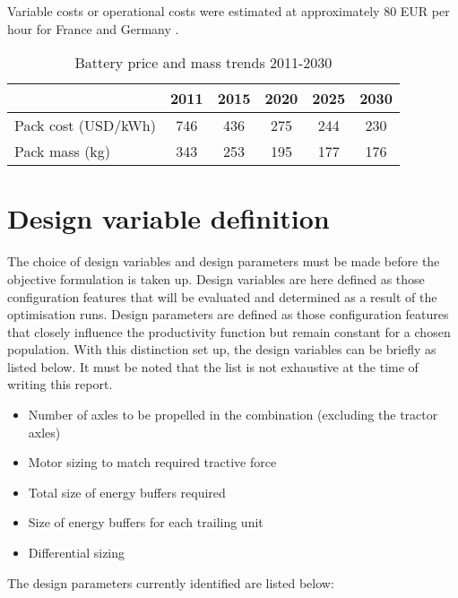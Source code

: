 \documentclass[ExampleMasters.tex]{subfiles}
\begin{document}
	Variable costs or operational costs were estimated at approximately 80 EUR per hour for France and Germany \cite{EuAECOM}.

	\begin{table}[ht]
		\centering 
		\begin{tabular}{l c c c c c}
			\cline{2-6}
			\ & 2011 & 2015 & 2020 & 2025 & 2030\\ 
			\hline
		    Pack cost (USD/kWh)  & 746 & 436 & 275 & 244 & 230\\
		    Pack mass (kg)  & 343 & 253 & 195  & 177 & 176\\
			\hline 
		\end{tabular}
		\caption{Battery price and mass trends 2011-2030 \cite{ElementEnergy}} 
		\label{table:batteryPriceMassTrend} 
	\end{table}

	\section{Design variable definition}
		The choice of design variables and design parameters must be made before the objective formulation is taken up. Design variables are here defined as those configuration features that will be evaluated and determined as a result of the optimisation runs. Design parameters are defined as those configuration features that closely influence the productivity function but remain constant for a chosen population. With this distinction set up, the design variables can be briefly as listed below. It must be noted that the list is not exhaustive at the time of writing this report.

		\begin{itemize}
		\item Number of axles to be propelled in the combination (excluding the tractor axles)
		\item Motor sizing to match required tractive force
		\item Total size of energy buffers required
		\item Size of energy buffers for each trailing unit
		\item Differential sizing
		\end{itemize}

		The design parameters currently identified are listed below:
\end{document}
